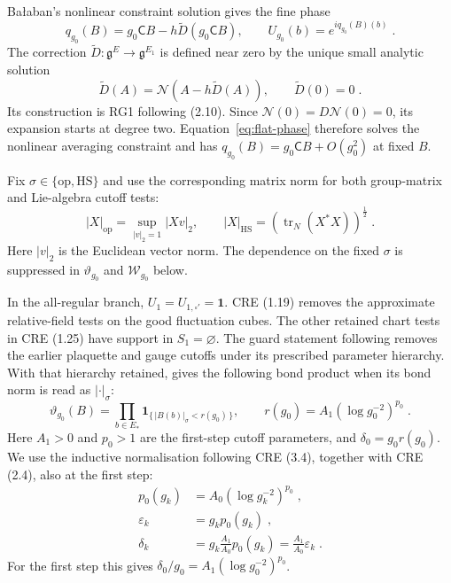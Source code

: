 \documentclass[11pt]{article}
\newcommand{\tr}{\operatorname{tr}}
\newcommand{\id}{\mathbf 1}
\begin{document}
Ba{\l}aban's nonlinear constraint solution gives the fine phase
\begin{equation}\label{eq:flat-phase}
    q_{g_0}(B)=g_0\mathsf C B-h\widetilde D(g_0\mathsf C B),
    \qquad U_{g_0}(b)=e^{iq_{g_0}(B)(b)}\;.
\end{equation}
The correction $\widetilde D \colon \mathfrak g^E\to\mathfrak g^{E_1}$ is defined near zero by the unique small analytic solution
\begin{equation}
    \widetilde D(A)=\mathcal N(A-h\widetilde D(A)),
    \qquad \widetilde D(0)=0\;.
\end{equation}
Its construction is RG1 following (2.10). Since $\mathcal N(0)=D\mathcal N(0)=0$, its expansion starts at degree two. Equation~\eqref{eq:flat-phase} therefore solves the nonlinear averaging constraint and has $q_{g_0}(B)=g_0\mathsf C B+O(g_0^2)$ at fixed $B$.

Fix $\sigma\in \{\mathrm{op},\mathrm{HS}\}$ and use the corresponding matrix norm for both group-matrix and Lie-algebra cutoff tests:
\begin{equation}\label{eq:marginal-two-norms}
    |X|_{\mathrm{op}}=\sup_{|v|_2=1}|Xv|_2,
    \qquad |X|_{\mathrm{HS}}=
        \left(\tr_N(X^*X)\right)^{\frac{1}{2}}\;.
\end{equation}
Here $|v|_2$ is the Euclidean vector norm. The dependence on the fixed $\sigma$ is suppressed in $\vartheta_{g_0}$ and $\mathcal W_{g_0}$ below.

In the all-regular branch, $U_1=U_{1,\square'}=\id$. CRE (1.19) removes the approximate relative-field tests on the good fluctuation cubes. The other retained chart tests in CRE (1.25) have support in $S_1=\varnothing$. The guard statement following \cite[(1.10)]{BalabanCRE} removes the earlier plaquette and gauge cutoffs under its prescribed parameter hierarchy. With that hierarchy retained, \cite[(1.18)--(1.19), (1.25)--(1.26)]{BalabanCRE} gives the following bond product when its bond norm is read as $|\cdot|_\sigma$:
\begin{equation}\label{eq:literal-cutoff}
    \vartheta_{g_0}(B)=\prod_{b\in E_*}
        \mathbf 1_{\{\,|B(b)|_\sigma<r(g_0)\,\}},
    \qquad r(g_0)=A_1(\log g_0^{-2})^{p_0}\;.
\end{equation}
Here $A_1>0$ and $p_0>1$ are the first-step cutoff parameters, and $\delta_0=g_0r(g_0)$. We use the inductive normalisation following CRE (3.4), together with CRE (2.4), also at the first step:
\begin{equation}\label{eq:cre-cutoff-normalisation}
    \begin{aligned}
        p_0(g_k)&=A_0(\log g_k^{-2})^{p_0}\;,\\
        \varepsilon_k&=g_kp_0(g_k)\;,\\
        \delta_k&=g_k\frac{A_1}{A_0}p_0(g_k)
            =\frac{A_1}{A_0}\varepsilon_k\;.
    \end{aligned}
\end{equation}
For the first step this gives $\delta_0/g_0=A_1(\log g_0^{-2})^{p_0}$.
\end{document}
